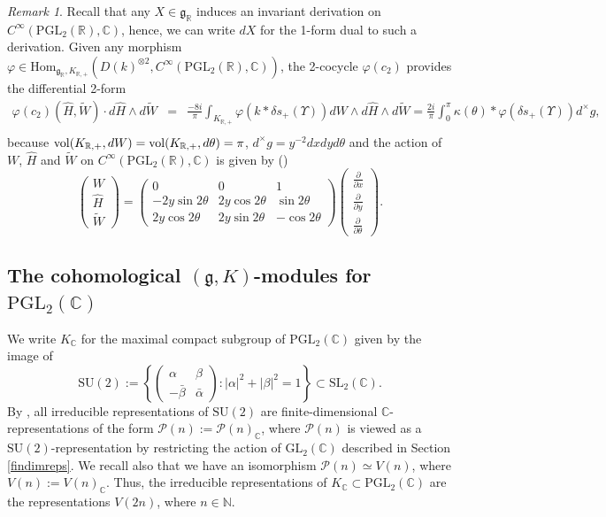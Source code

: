 \documentclass{amsart}
\theoremstyle{definition}
\theoremstyle{remark}
\newtheorem{remark}[theorem]{Remark}
\numberwithin{equation}{section}
\newcommand{\PGL}{{\mathrm{PGL}}}
\newcommand{\GL}{{\mathrm{GL}}}
\newcommand{\SU}{{\mathrm{SU}}}
\newcommand{\SL}{{\mathrm {SL}}}
\newcommand{\C}{{\mathbb C}}
\newcommand{\R}{{\mathbb R}}
\newcommand{\N}{{\mathbb N}}
\newcommand{\cP}{{\mathcal P}}
\newcommand{\mfg}{{\mathfrak g}}
\newcommand{\Hom}{{\mathrm {Hom}}}
\begin{document}
\begin{remark}\label{remarkonhaarmeasurecocycle1}
Recall that any $X\in\mfg_\R$ induces an invariant derivation on $C^\infty(\PGL_2(\R),\C)$, hence, we can write $dX$ for the 1-form dual to such a derivation. Given any morphism $\varphi\in\Hom_{\mfg_\R,K_{\R,+}}(D(k)^{\otimes 2},C^\infty(\PGL_2(\R),\C))$, the 2-cocycle $\varphi(c_2)$ provides the differential 2-form
    \begin{eqnarray*}
    \varphi(c_2)(\hat H,\tilde W)\cdot d\hat H\wedge d\tilde W&=&\frac{-8i}{\pi}\int_{K_{\R,+}}\varphi\left(k\ast  \delta s_+(\Upsilon)\right)d W\wedge d\hat H\wedge d\tilde W =\frac{2i}{\pi}\int_0^\pi\kappa(\theta)\ast \varphi\left( \delta s_+(\Upsilon)\right)d^\times g,\\
    \end{eqnarray*}
    because ${\rm vol}(K_{\R,+},dW)={\rm vol}(K_{\R,+},d\theta)=\pi$, $d^\times g=y^{-2}dxdyd\theta$ and the action of $W$, $\hat H$ and $\tilde W$ on $C^\infty(\PGL_2(\R),\C)$ is given by (\cite[proposition 2.2.5]{Bump})
    \[
    \left(\begin{array}{c} W \\ \hat H\\\tilde W\end{array}\right)=\left(\begin{array}{ccc} 0&0&1 \\ -2y\sin 2\theta&2y\cos 2\theta&\sin 2\theta\\2y\cos 2\theta&2y\sin 2\theta&-\cos2\theta\end{array}\right)\left(\begin{array}{c} \frac{\partial}{\partial x} \\ \frac{\partial}{\partial y}\\\frac{\partial}{\partial\theta}\end{array}\right).
    \]
\end{remark}


\subsection{The cohomological $(\mfg,K)$-modules for $\PGL_2(\C)$}\label{GKC}
We write $K_\C$ for the maximal compact subgroup of $\PGL_2(\C)$ given by the image of 
\[
\SU(2):=\left\{\left(\begin{array}{cc}\alpha&\beta\\-\bar \beta&\bar \alpha\end{array}\right)\colon |\alpha|^2+|\beta|^2=1\right\}\subset \SL_2(\C).
\]
By \cite{Hall}, all irreducible representations of $\SU(2)$ are finite-dimensional $\C$-representations of the form $\cP(n):=\cP(n)_\C$, where $\cP(n)$ is viewed as a $\SU(2)$-representation by restricting the action of $\GL_2(\C)$ described in Section \ref{findimreps}. We recall also that we have an isomorphism $\cP(n)\simeq V(n)$, where $V(n):= V(n)_\C$.  Thus, the irreducible representations of $K_\C\subset\PGL_2(\C)$ are the representations $V(2n)$, where $n\in\N$. 
\end{document}
